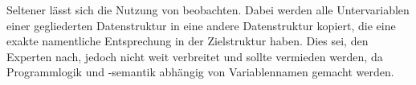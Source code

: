 Seltener lässt sich die Nutzung von  beobachten. Dabei werden alle Untervariablen einer gegliederten Datenstruktur in eine andere Datenstruktur kopiert, die eine exakte namentliche Entsprechung in der Zielstruktur haben. Dies sei, den Experten nach, jedoch nicht weit verbreitet und sollte vermieden werden, da Programmlogik und -semantik abhängig von Variablennamen gemacht werden.